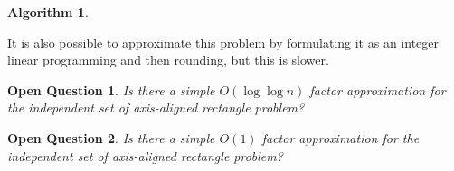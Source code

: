 \documentclass[11pt]{article}
\newtheorem{algorithm}{Algorithm}
\newtheorem{openquestion}{Open Question}
\begin{document}
\begin{algorithm}
\end{algorithm}

It is also possible to approximate this problem by formulating it as an integer linear programming and then rounding, but this is slower.

\begin{openquestion}
Is there a simple $O(\log\log n)$ factor approximation for the independent set of axis-aligned rectangle problem?
\end{openquestion}

\begin{openquestion}
Is there a simple $O(1)$ factor approximation for the independent set of axis-aligned rectangle problem?
\end{openquestion}



\end{document}
